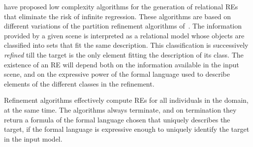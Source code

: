  have proposed low complexity algorithms for the generation 
of relational REs 
that eliminate the risk of infinite regression. 
These algorithms are based on different variations of the partition refinement algorithms of~.
The information provided by a given scene is interpreted as a relational model whose 
objects are classified into sets that fit the same description.  
This classification is successively \emph{refined}  till the target 
is the only element fitting the description of its class.  The existence of an RE will 
depend both on the information available in the input scene, and on the expressive power of the formal 
language used to describe elements of the different classes in the refinement. 


Refinement algorithms %
effectively compute REs for all individuals in the domain, at the same time. The algorithms always terminate, and on termination they return a formula of 
the formal language chosen that uniquely describes the target, if the 
formal language is expressive enough to uniquely identify the target in the input model. 

